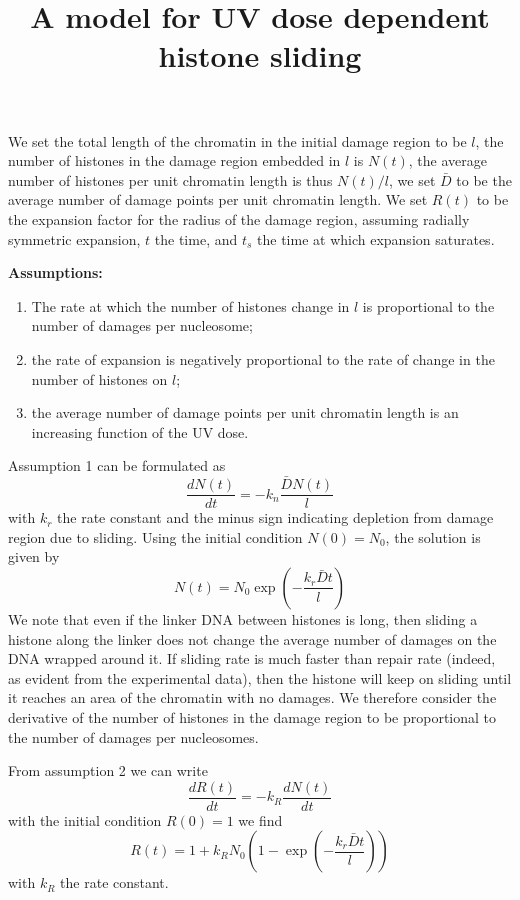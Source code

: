 \documentclass[12pt]{paper}
\begin{document}
	
\title{A model for UV dose dependent histone sliding}
\maketitle

We set the total length of the chromatin in the initial damage region to be $l$, the number of histones in the damage region embedded in $l$ is $N(t)$, the average number of histones per unit chromatin length is thus $N(t)/l$, we set $\bar{D}$ to be the average number of damage points per unit chromatin length. We set $R(t)$ to be the expansion factor for the radius of the damage region, assuming radially symmetric expansion, $t$ the time, and $t_s$ the time at which expansion saturates. 

\textbf{Assumptions:} 
\begin{enumerate}
	\item The rate at which the number of histones change in $l$ is proportional to the number of damages per nucleosome;
	\item the rate of expansion is negatively proportional to the rate of change in the number of histones on $l$;
	\item the average number of damage points per unit chromatin length is an increasing function of the UV dose. 
\end{enumerate}

Assumption 1 can be formulated as 
\begin{equation*}
\frac{dN(t)}{dt} = -k_n\frac{\bar{D}N(t)}{l}
\end{equation*}
with $k_r$ the rate constant and the minus sign indicating depletion from damage region due to sliding. Using the initial condition $N(0) = N_0$, the solution is given by 
\begin{equation}\label{eq:NumHistones}
N(t) = N_0\exp(-\frac{k_r\bar{D}t}{l})
\end{equation}
We note that even if the linker DNA between histones is long, then sliding a histone along the linker does not change the average number of damages on the DNA wrapped around it. If sliding rate is much faster than repair rate (indeed, as evident from the experimental data), then the histone will keep on sliding until it reaches an area of the chromatin with no damages. We therefore consider the derivative of the number of histones in the damage region to be proportional to the number of damages per nucleosomes.  

From assumption 2 we can write 
\begin{equation*}
\frac{dR(t)}{dt}=-k_R\frac{dN(t)}{dt}
\end{equation*}
with the initial condition $R(0)=1$ we find 
\begin{equation}\label{eq:expansionFactor}
R(t) = 1+k_RN_0(1-\exp(-\frac{k_r\bar{D}t}{l}))
\end{equation}
with $k_R$ the rate constant.
\end{document}
